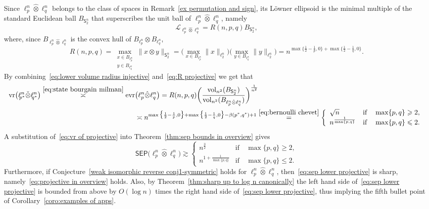 \documentclass[11pt,reqno]{amsart}
\renewcommand{\le}{\leqslant}
\renewcommand{\ge}{\geqslant}
\newcommand{\vr}{\mathrm{vr}}
\newcommand{\evr}{\mathrm{evr}}
\theoremstyle{remark}
\newcommand{\sfS}{\mathsf{S}}
\newcommand{\vol}{\mathrm{vol}}
\renewcommand{\1}{\mathbf 1}
\newcommand{\sep}{\mathsf{SEP}}
\newcommand{\tp}{\hat{\otimes}}
\newcommand{\ti}{\check{\otimes}}
\begin{document}
Since $\ell_p^n\tp \ell_q^n$ belongs to the class of spaces in Remark~\ref{ex permutation and sign}, its L\"owner ellipsoid is the minimal multiple of the standard Euclidean ball $B_{\sfS_2^n}$ that superscribes the unit ball of $\ell_p^n\tp \ell_q^n$, namely
$$
\mathscr{L}_{\ell_p^n\tp \ell_q^n}=R(n,p,q)B_{\sfS_2^n},
$$
where, since $B_{\ell_p^n\tp \ell_q^n}$ is the convex hull of $B_{\ell_p^n}\otimes B_{\ell_q^n}$,
\begin{equation}\label{eq:R projective}
R(n,p,q) =\max_{\substack{x\in B_{\ell_p^n}\\ y\in B_{\ell_q^n}}} \|x\otimes y\|_{\sfS_2^n}= \Big(\max_{x\in B_{\ell_p^n}} \|x\|_{\ell_2^n}\Big)\Big(\max_{y\in B_{\ell_q^n}} \|y\|_{\ell_2^n}\Big)= n^{\max\big\{\frac12-\frac{1}{p},0\big\}+\max\big\{\frac12-\frac{1}{q},0\big\}}.
\end{equation}
By combining~\eqref{eq:lower volume radius injective} and~\eqref{eq:R projective} we  get that
\begin{align}\label{eq:vr of projective}
\begin{split}
\vr\big(\ell_{\!\! p^*}^n\ti \ell_{\!\! q^*}^n\big)\stackrel{\eqref{eq:state bourgain milman}}{\asymp}\evr&\big(\ell_p^n\tp \ell_q^n\big)= R(n,p,q) \bigg(\frac{\vol_{n^2}(B_{\sfS_2^n})}{\vol_{n^2} (B_{\ell_p^n\tp \ell_q^n})}\bigg)^{\frac{1}{n^2}}\\&\asymp n^{\max\big\{\frac12-\frac{1}{p},0\big\}+\max\big\{\frac12-\frac{1}{q},0\big\}-\beta(p^*,q^*)+1}\stackrel{\eqref{eq:bernoulli chevet}}{=} \left\{ \begin{array}{ll} \sqrt{n} &\mathrm{if}\quad  \max\{p,q\}\ge 2,\\ n^{\frac{1}{\max\{p,q\}}} & \mathrm{if}\quad  \max\{p,q\}\le 2.
  \end{array} \right.
\end{split}
\end{align}
A substitution of~\eqref{eq:vr of projective} into Theorem~\ref{thm:sep bounds in overview} gives
\begin{equation}\label{eq:sep lower projective}
\sep\big(\ell_p^n\tp \ell_q^n\big)\gtrsim \left\{ \begin{array}{ll} n^{\frac32} &\mathrm{if}\quad  \max\{p,q\}\ge 2,\\ n^{1+\frac{1}{\max\{p,q\}}} & \mathrm{if}\quad  \max\{p,q\}\le 2.\end{array} \right.
\end{equation}
Furthermore, if Conjecture~\ref{weak isomorphic reverse conj1-symmetric} holds for $\ell_p^n\tp \ell_q^n$, then~\eqref{eq:sep lower projective} is sharp, namely~\eqref{eq:projective in overview} holds. Also, by Theorem~\ref{thm:sharp up to log n canonically} the left hand side of~\eqref{eq:sep lower projective}  is bounded from above by $O(\log n)$ times the right  hand side of~\eqref{eq:sep lower projective}, thus implying the fifth bullet point of Corollary~\ref{coro:examples of apps}.
\end{document}
